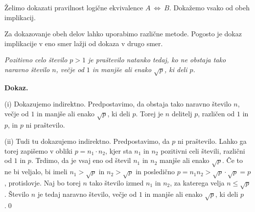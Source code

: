 \documentclass[11pt,paper=b5,footinclude,headinclude]{scrbook} %
\newcounter{example}
\def\cee {{~\Leftrightarrow~}}
\begin{document}
Želimo dokazati pravilnost logične ekvivalence $A\cee B$.
Dokažemo vsako od obeh implikacij.

Za dokazovanje obeh delov lahko uporabimo različne metode.
Pogosto je dokaz implikacije v eno smer lažji od dokaza v drugo smer.

\begin{example*}

\emph{ Pozitivno celo število $p>1$ je praštevilo natanko tedaj, ko ne obstaja tako naravno število
$n$, večje od $1$ in manjše ali enako $\sqrt{p}$, ki deli $p$.}

\medskip \noindent\textbf{ Dokaz.}

(i) Dokazujemo indirektno. Predpostavimo, da obstaja tako naravno število
$n$, večje od $1$ in manjše ali enako $\sqrt{p}$, ki deli $p$. Torej je $n$ delitelj $p$, različen od
$1$ in $p$, in $p$ ni praštevilo.

(ii) Tudi tu dokazujemo indirektno. Predpostavimo, da $p$ ni praštevilo. Lahko ga torej zapišemo v obliki
$p = n_1\cdot n_2$, kjer sta $n_1$ in $n_2$ pozitivni celi števili, različni od $1$ in $p$.
Trdimo, da je vsaj eno od  števil $n_1$ in $n_2$ manjše ali enako $\sqrt{p}$.
Če to ne bi veljalo, bi imeli $n_1>\sqrt{p}$ in $n_2>\sqrt{p}$ in posledično
$p = n_1n_2>\sqrt{p}\cdot\sqrt{p} = p$, protislovje.
Naj bo torej $n$ tako število izmed $n_1$ in $n_2$, za katerega velja  $n\le \sqrt{p}$.
Število $n$ je tedaj naravno število, večje od $1$ in manjše ali enako $\sqrt{p}$, ki deli $p$.\qed
\end{example*}
\medskip
\end{document}
